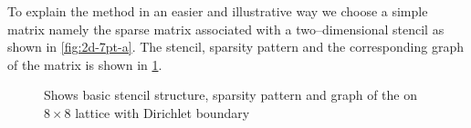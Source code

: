 To explain the method in an easier and illustrative way we choose a simple matrix namely the sparse matrix associated with a two--dimensional stencil as shown in \cref{fig:2d-7pt-a}. The stencil, sparsity pattern and the corresponding graph of the matrix is shown in \cref{fig:2d-7pt}.

\begin{figure}[tbhp]
	\centering
	\hspace{0.8em}
	\hspace{1em}
	\caption{Shows basic stencil structure, sparsity pattern and graph of the \stex on $8 \times 8$ lattice with Dirichlet boundary}
	\label{fig:2d-7pt}
\end{figure}

